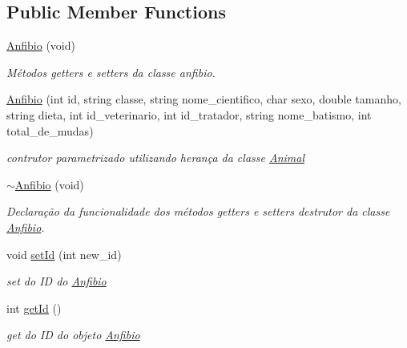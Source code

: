 \subsection*{Public Member Functions}
\begin{DoxyCompactItemize}
\item 
\mbox{\label{class_anfibio_a009dc173162373a3eb1e10782d2876e7}} 
\mbox{\hyperlink{class_anfibio_a009dc173162373a3eb1e10782d2876e7}{Anfibio}} (void)
\begin{DoxyCompactList}\small\item\em Métodos getters e setters da classe anfibio. \end{DoxyCompactList}\item 
\mbox{\label{class_anfibio_a1359bcb89f75a39b251945515a1939fc}} 
\mbox{\hyperlink{class_anfibio_a1359bcb89f75a39b251945515a1939fc}{Anfibio}} (int id, string classe, string nome\+\_\+cientifico, char sexo, double tamanho, string dieta, int id\+\_\+veterinario, int id\+\_\+tratador, string nome\+\_\+batismo, int total\+\_\+de\+\_\+mudas)
\begin{DoxyCompactList}\small\item\em contrutor parametrizado utilizando herança da classe \mbox{\hyperlink{class_animal}{Animal}} \end{DoxyCompactList}\item 
\mbox{\label{class_anfibio_ae165dd485f0c879e2a6985af8143a0d4}} 
\mbox{\hyperlink{class_anfibio_ae165dd485f0c879e2a6985af8143a0d4}{$\sim$\+Anfibio}} (void)
\begin{DoxyCompactList}\small\item\em Declaração da funcionalidade dos métodos getters e setters destrutor da classe \mbox{\hyperlink{class_anfibio}{Anfibio}}. \end{DoxyCompactList}\item 
void \mbox{\hyperlink{class_anfibio_a2341cd74a2afd9e5e646a4a7541a912a}{set\+Id}} (int new\+\_\+id)
\begin{DoxyCompactList}\small\item\em set do ID do \mbox{\hyperlink{class_anfibio}{Anfibio}} \end{DoxyCompactList}\item 
int \mbox{\hyperlink{class_anfibio_a1bcae8c79bb6e88d7d8a808a0a16e2d5}{get\+Id}} ()
\begin{DoxyCompactList}\small\item\em get do ID do objeto \mbox{\hyperlink{class_anfibio}{Anfibio}} \end{DoxyCompactList}\item 

\end{DoxyCompactItemize}
